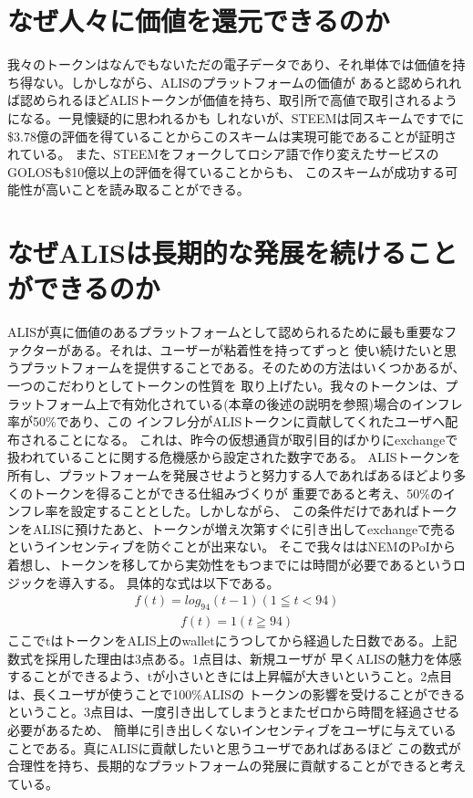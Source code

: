 \documentclass{jsarticle}
\begin{document}
\section{なぜ人々に価値を還元できるのか}
我々のトークンはなんでもないただの電子データであり、それ単体では価値を持ち得ない。しかしながら、ALISのプラットフォームの価値が
あると認められれば認められるほどALISトークンが価値を持ち、取引所で高値で取引されるようになる。一見懐疑的に思われるかも
しれないが、STEEMは同スキームですでに\$3.78億の評価を得ていることからこのスキームは実現可能であることが証明されている。
また、STEEMをフォークしてロシア語で作り変えたサービスのGOLOSも\$10億以上の評価を得ていることからも、
このスキームが成功する可能性が高いことを読み取ることができる。
\section{なぜALISは長期的な発展を続けることができるのか}
ALISが真に価値のあるプラットフォームとして認められるために最も重要なファクターがある。それは、ユーザーが粘着性を持ってずっと
使い続けたいと思うプラットフォームを提供することである。そのための方法はいくつかあるが、一つのこだわりとしてトークンの性質を
取り上げたい。我々のトークンは、プラットフォーム上で有効化されている(本章の後述の説明を参照)場合のインフレ率が50\%であり、この
インフレ分がALISトークンに貢献してくれたユーザへ配布されることになる。
これは、昨今の仮想通貨が取引目的ばかりにexchangeで扱われていることに関する危機感から設定された数字である。
ALISトークンを所有し、プラットフォームを発展させようと努力する人であればあるほどより多くのトークンを得ることができる仕組みづくりが
重要であると考え、50\%のインフレ率を設定することとした。しかしながら、
この条件だけであればトークンをALISに預けたあと、トークンが増え次第すぐに引き出してexchangeで売るというインセンティブを防ぐことが出来ない。
そこで我々ははNEMのPoIから着想し、トークンを移してから実効性をもつまでには時間が必要であるというロジックを導入する。
具体的な式は以下である。
\begin{align}
f(t) = log_{94}(t-1) (1 ≦ t < 94)
\end{align}
\begin{align}
f(t) = 1 (t ≧ 94)
\end{align}
ここでtはトークンをALIS上のwalletにうつしてから経過した日数である。上記数式を採用した理由は3点ある。1点目は、新規ユーザが
早くALISの魅力を体感することができるよう、tが小さいときには上昇幅が大きいということ。2点目は、長くユーザが使うことで100\%ALISの
トークンの影響を受けることができるということ。3点目は、一度引き出してしまうとまたゼロから時間を経過させる必要があるため、
簡単に引き出しくないインセンティブをユーザに与えていることである。真にALISに貢献したいと思うユーザであればあるほど
この数式が合理性を持ち、長期的なプラットフォームの発展に貢献することができると考えている。
\end{document}
